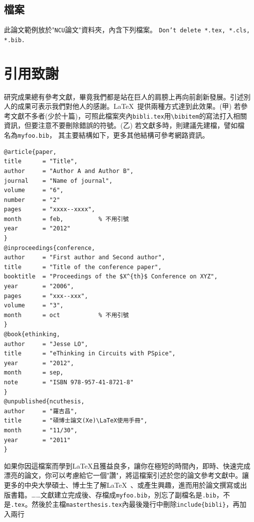 \subsection{檔案}
此論文範例放於"{\tt NCU}論文"資料夾，內含下列檔案。
  
{\color{red} \Huge \tt Don't delete *.tex, *.cls, *.bib.} 
\section{引用致謝}
研究成果總有參考文獻，畢竟我們都是站在巨人的肩膀上再向前創新發展。引述別人的成果可表示我們對他人的感謝。\LaTeX\ 提供兩種方式達到此效果。(甲)
若參考文獻不多者(少於十篇)，可照此檔案夾內{\tt bibli.tex}用\verb+\bibitem+的寫法打入相關資訊，但要注意不要刪除錯誤的符號。(乙) 若文獻多時，則建議先建檔，譬如檔名為{\tt myfoo.bib}， 其主要結構如下，更多其他結構可參考網路資訊。
\\
\begin{Verbatim}[frame=single,firstline=1,lastline=32,rulecolor=\color{red},label=Typing up myfoo.tex]
@article{paper,
title      = "Title",
author     = "Author A and Author B",
journal    = "Name of journal",
volume     = "6",
number     = "2"
pages      = "xxxx--xxxx",
month      = feb,          % 不用引號
year       = "2012"
}
@inproceedings{conference,
author     = "First author and Second author",
title      = "Title of the conference paper",
booktitle  = "Proceedings of the $X^{th}$ Conference on XYZ",
year       = "2006",
pages      = "xxx--xxx",
volume     = "3",
month      = oct           % 不用引號
}
@book{ethinking,
author     = "Jesse LO",
title      = "eThinking in Circuits with PSpice",
year       = "2012",
month      = sep,
note       = "ISBN 978-957-41-8721-8"
}
@unpublished{ncuthesis,
author     = "羅吉昌",
title      = "碩博士論文(Xe)\LaTeX使用手冊",
month      = "11/30",          
year       = "2011"
}
\end{Verbatim}
如果你因這檔案而學到\LaTeX{}且獲益良多，讓你在極短的時間內，即時、快速完成漂亮的論文，你可以考慮給它一個"讚"，將這檔案引述於您的論文參考文獻中。讓更多的中央大學碩士、博士生了解\LaTeX\ 、或產生興趣，進而用於論文撰寫或出版書籍。\ldots \ldots 文獻建立完成後、存檔成{\tt myfoo.bib}，別忘了副檔名是{\color{red}\tt .bib}，不是{\color{red}\tt .tex}。然後於主檔{\tt masterthesis.tex}內最後幾行中刪除\verb+include{bibli}+，再加入兩行\\
